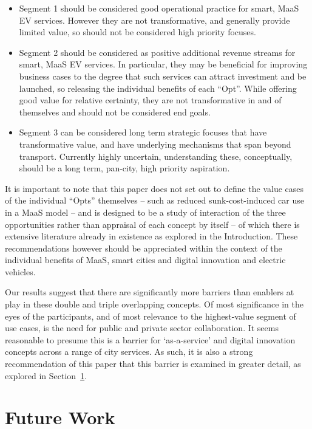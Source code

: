 \documentclass[journal]{IEEEtran}
\begin{document}
\begin{itemize}
\item Segment 1 should be considered good operational practice for
  smart, MaaS EV services. However they are not transformative, and
  generally provide limited value, so should not be considered high
  priority focuses. 
\item Segment 2 should be considered as positive additional revenue
  streams for smart, MaaS EV services. In particular, they may be
  beneficial for improving business cases to the degree that such
  services can attract investment and be launched, so releasing the
  individual benefits of each ``Opt''. While offering good value for
  relative certainty, they are not transformative in and of themselves
  and should not be considered end goals.
\item Segment 3 can be considered long term strategic focuses that
  have transformative value, and have underlying mechanisms that span
  beyond transport. Currently highly uncertain, understanding these,
  conceptually, should be a long term, pan-city, high priority
  aspiration.
\end{itemize}

It is important to note that this paper does not set out to define the
value cases of the individual ``Opts'' themselves -- such as reduced
sunk-cost-induced car use in a MaaS model -- and is designed to be a
study of interaction of the three opportunities rather than appraisal
of each concept by itself -- of which there is extensive literature
already in existence as explored in the Introduction. These
recommendations however should be appreciated within the context of
the individual benefits of MaaS, smart cities and digital innovation
and electric vehicles.

Our results suggest that there are significantly more barriers than
enablers at play in these double and triple overlapping concepts. Of
most significance in the eyes of the participants, and of most
relevance to the highest-value segment of use cases, is the need for
public and private sector collaboration. It seems reasonable to
presume this is a barrier for `as-a-service' and digital innovation
concepts across a range of city services. As such, it is also a strong
recommendation of this paper that this barrier is examined in greater
detail, as explored in Section~\ref{future}.


\section{Future Work}\label{future}
\end{document}
